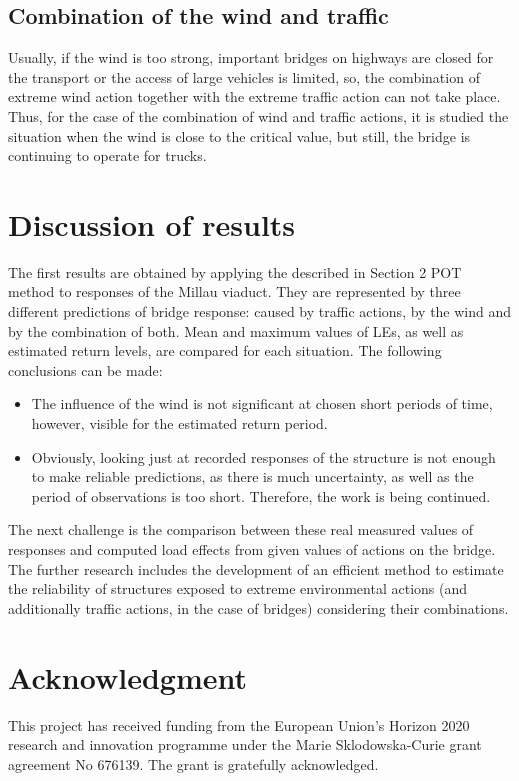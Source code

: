 \documentclass[11pt,a4paper]{article}
\begin{document}
\subsection{Combination of the wind and traffic}
Usually, if the wind is too strong, important bridges on highways are closed for the transport or the access of large vehicles is limited, so, the combination of extreme wind action together with the extreme traffic action can not take place. Thus, for the case of the combination of wind and traffic actions, it is studied the situation when the wind is close to the critical value, but still, the bridge is continuing to operate for trucks.
\section{Discussion of results}
\medskip
The first results are obtained by applying the described in Section 2 POT method to responses of the   Millau viaduct. They are represented by three different predictions of bridge response: caused by traffic actions, by the wind and by the combination of both. Mean and maximum values of LEs, as well as estimated return levels, are compared for each situation.
The following conclusions can be made:
\begin{itemize}
	\item The influence of the wind is not significant at chosen short periods of time, however, visible for the estimated return period.
	\item Obviously, looking just at recorded responses of the structure is not enough to make reliable predictions, as there is much uncertainty, as well as the period of observations is too short. Therefore, the work is being continued.
\end{itemize}
The next challenge is the comparison between these real measured values of responses and computed load effects from given values of actions on the bridge. The further research includes the development of an efficient method to estimate the reliability of structures exposed to extreme environmental actions (and additionally traffic actions, in the case of bridges)  considering their combinations. 
\section{Acknowledgment}
\medskip
This project has received funding from the European Union's Horizon 2020 research and innovation programme under the Marie Sklodowska-Curie grant agreement No 676139. The grant is gratefully acknowledged.
\end{document}
